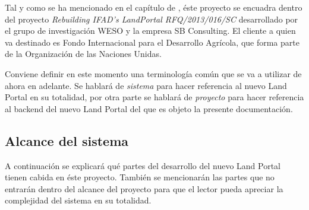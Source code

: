 Tal y como se ha mencionado en el capítulo de , éste proyecto se encuadra dentro del proyecto \textit{Rebuilding IFAD's LandPortal RFQ/2013/016/SC} desarrollado por el grupo de investigación WESO y la empresa SB Consulting. El cliente a quien va destinado es Fondo Internacional para el Desarrollo Agrícola, que forma parte de la Organización de las Naciones Unidas.

Conviene definir en este momento una terminología común que se va a utilizar de ahora en adelante.  Se hablará de \textit{sistema} para hacer referencia al nuevo Land Portal en su totalidad, por otra parte se hablará de \textit{proyecto} para hacer referencia al backend del nuevo Land Portal del que es objeto la presente documentación.


\subsection{Alcance del sistema}
A continuación se explicará qué partes del desarrollo del nuevo Land Portal tienen cabida en éste proyecto.  También se mencionarán las partes que no entrarán dentro del alcance del proyecto para que el lector pueda apreciar la complejidad del sistema en su totalidad.

